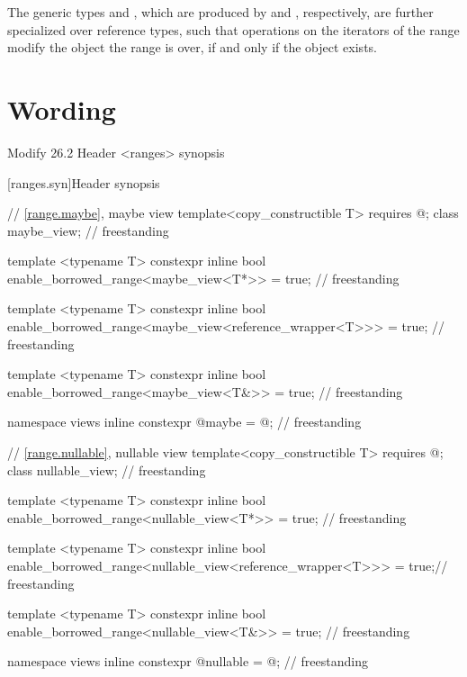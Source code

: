 \documentclass[a4paper,10pt,oneside,openany,final,article]{memoir}
\begin{document}
The generic types  and , which are produced by  and , respectively, are further specialized over reference types, such that operations on the iterators of the range modify the object the range is over, if and only if the object exists.


\chapter{Wording}
\begin{wording}


Modify 26.2 Header <ranges> synopsis

[ranges.syn]{Header  synopsis}

\begin{adjustwidth}{1cm}{1cm}
  \begin{addedblock}
    \begin{codeblock}
// \ref{range.maybe}, maybe view
template<copy_constructible T>
requires @\seebelow@;
class maybe_view;                                              // freestanding

template <typename T>
constexpr inline bool
enable_borrowed_range<maybe_view<T*>> = true;                  // freestanding

template <typename T>
constexpr inline bool
enable_borrowed_range<maybe_view<reference_wrapper<T>>> = true; // freestanding

template <typename T>
constexpr inline bool
enable_borrowed_range<maybe_view<T&>> = true;                  // freestanding

namespace views {
  inline constexpr @\unspec@ maybe = @\unspec@;           // freestanding
}

// \ref{range.nullable}, nullable view
template<copy_constructible T>
requires @\seebelow@;
class nullable_view;                                           // freestanding

template <typename T>
constexpr inline bool
enable_borrowed_range<nullable_view<T*>> = true;               // freestanding

template <typename T>
constexpr inline bool
enable_borrowed_range<nullable_view<reference_wrapper<T>>> = true;// freestanding

template <typename T>
constexpr inline bool
enable_borrowed_range<nullable_view<T&>> = true;                // freestanding

namespace views {
  inline constexpr @\unspec@ nullable = @\unspec@;        // freestanding
}




\end{codeblock}
\end{addedblock}
\end{adjustwidth}
\end{wording}
\end{document}
